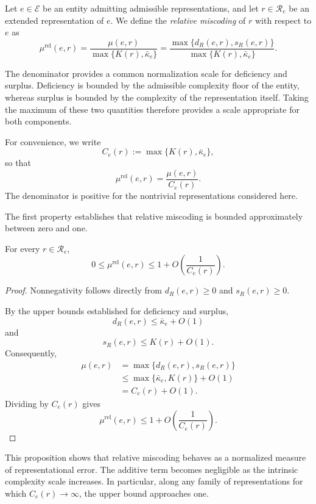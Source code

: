 \begin{definition}
\label{def:relative_miscoding}
Let $e\in\mathcal E$ be an entity admitting admissible representations, and let $r\in\mathcal R_e$ be an extended representation of $e$. We define the \emph{relative miscoding} of $r$ with respect to $e$ as
\[
\mu^{\mathrm{rel}}(e,r) = \frac{\mu(e,r)} {\max\{K(r),\bar\kappa_e\}}
= \frac{\max\{d_R(e,r),s_R(e,r)\}}{\max\{K(r),\bar\kappa_e\}}.
\]
\end{definition}

The denominator provides a common normalization scale for deficiency and surplus. Deficiency is bounded by the admissible complexity floor of the entity, whereas surplus is bounded by the complexity of the representation itself. Taking the maximum of these two quantities therefore provides a scale appropriate for both components.

\begin{notation}
For convenience, we write
\[
C_e(r):=\max\{K(r),\bar\kappa_e\},
\]
so that
\[
\mu^{\mathrm{rel}}(e,r)=\frac{\mu(e,r)}{C_e(r)}.
\]
The denominator is positive for the nontrivial representations considered here.
\end{notation}

The first property establishes that relative miscoding
is bounded approximately between zero and one.

\begin{proposition}
\label{prop:range_rel_miscoding}
For every $r\in\mathcal R_e$,
\[
0 \le \mu^{\mathrm{rel}}(e,r) \le 1 + O\left(\frac{1}{C_e(r)}\right).
\]
\end{proposition}
\begin{proof}
Nonnegativity follows directly from $d_R(e,r)\ge 0$ and $s_R(e,r)\ge 0$.

By the upper bounds established for deficiency and surplus,
\[
d_R(e,r)\le\bar\kappa_e+O(1)
\]
and
\[
s_R(e,r)\le K(r)+O(1).
\]
Consequently,
\[
\begin{aligned}
\mu(e,r)
&=\max\{d_R(e,r),s_R(e,r)\}\\
&\le\max\{\bar\kappa_e,K(r)\}+O(1)\\
&=C_e(r)+O(1).
\end{aligned}
\]
Dividing by $C_e(r)$ gives
\[
\mu^{\mathrm{rel}}(e,r)
\le
1+O\left(\frac{1}{C_e(r)}\right).
\]
\end{proof}

This proposition shows that relative miscoding behaves as a normalized measure of representational error. The additive term becomes negligible as the intrinsic complexity scale increases. In particular, along any family of representations for which $C_e(r)\to\infty$, the upper bound approaches one.

